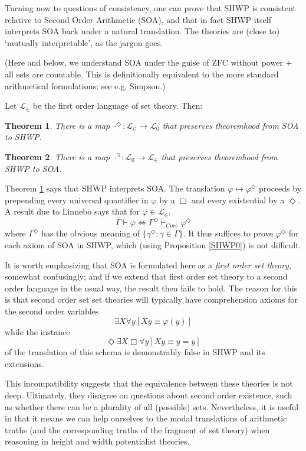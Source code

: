 \documentclass{article}
\newtheorem{theorem}{Theorem}
\begin{document}
Turning now to questions of consistency, 
one can prove that SHWP is 
consistent relative to Second Order Arithmetic (SOA), and that 
in fact SHWP itself interprets SOA back under a natural translation.
The theories are (close to) `mutually interpretable', as the jargon goes.

(Here and below, we understand SOA under the guise of 
ZFC without power + all sets are countable. This is 
definitionally equivalent to the more standard
arithmetical formulations; see e.g. Simpson.)

Let $\mathcal{L}_\in$ be the first order 
language of set theory. Then:
\begin{theorem}\label{SHWP1}
    There is a map $\cdot^\Diamond : \mathcal{L}_\in \to \mathcal{L}_0$ that preserves 
    theoremhood from SOA to SHWP.
\end{theorem}
\begin{theorem}\label{SHWP2}
    There is a map $\cdot^\exists : \mathcal{L}_0 \to \mathcal{L}_\in$ that preserves 
    theoremhood from SHWP to
    SOA.
\end{theorem}
Theorem \ref{SHWP1} says that SHWP interprets SOA.
The translation $\varphi \mapsto \varphi^\Diamond$ proceeds by prepending every 
universal quantifier in $\varphi$ by a $\Box$ and every existential by a $\Diamond$.
A result due to Linnebo says that for $\varphi \in \mathcal{L}_\in$, 
\[\Gamma \vdash \varphi \Leftrightarrow \Gamma^\Diamond \vdash_{Core} \varphi^\Diamond\]
where $\Gamma^\Diamond$ has the obvious meaning of $\{\gamma^\Diamond : \gamma \in \Gamma\}$.
It thus suffices to prove $\varphi^\Diamond$ for each axiom of SOA in SHWP, 
which (using Proposition \ref{SHWP0}) is not difficult. 

It is worth emphasizing 
that SOA is formulated here as a \emph{first order set theory}, somewhat confusingly; 
and if we extend that first order set theory to a second order language in the usual way, 
the result then fails to hold. The reason for this is that second order set set theories 
will typically have comprehension axioms for the second order variables
$$\exists X \forall y [Xy \equiv \varphi(y)] $$
while the instance 
$$ \Diamond \exists X \Box \forall y[Xy \equiv y = y]$$
of the translation of this schema is demonstrably false in SHWP and its extensions.

This incompatibility suggests that the equivalence 
between these theories is not deep. Ultimately, they disagree on questions about 
second order existence, 
such as whether there can be a plurality of all (possible) sets. Nevertheless, 
it is useful in that it means we can help ourselves to the modal translations 
of arithmetic truths (and the corresponding truths of the fragment of set theory)
when reasoning in height and width potentialist theories.
\end{document}
